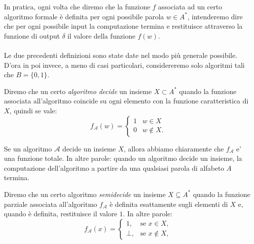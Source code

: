 In pratica, ogni volta che diremo che la funzione $f$ associata ad un certo algoritmo formale è definita per ogni possibile parola $w \in A^*$, intenderemo dire che per ogni possibile input la computazione termina e restituisce attraverso la funzione di output $\delta$ il valore della funzione $f(w)$.
\\ \\
Le due precedenti definizioni sono state date nel modo più generale possibile.
D'ora in poi invece,
a meno di casi particolari,
considereremo solo algoritmi tali che $B=\{ 0,1\}$.

\begin{defi}
Diremo che un certo \textit{algoritmo decide} un insieme 
$X \subset A^*$
 quando la funzione associata all'algoritmo coincide su ogni elemento con la funzione caratteristica di 
 $X$,
quindi se vale:
\[
f_\mathcal{A}(w) = 
\begin{cases} 1 & w \in X \\ 0 & w \notin X. \end{cases}
\]
\end{defi}

\begin{rema}
Se un algoritmo $\mathcal A$
decide un insieme $X$,
allora abbiamo chiaramente che $f_{\mathcal A}$ 
e' una funzione totale.
In altre parole:
quando un algoritmo decide un insieme,
la computazione dell'algoritmo a partire da una qualsiasi parola di alfabeto 
$A$
termina.
\end{rema}

\begin{defi}
Diremo che un certo algoritmo  \textit{semidecide} un insieme
$X \subseteq A^*$ quando la funzione parziale associata all'algoritmo
$f_{\mathcal A}$ è definita esattamente sugli elementi di $X$ e, quando è
definita, restituisce il valore $1$. In altre parole:
\[
f_{\mathcal A}(x)=
\begin{cases}
1, & \text{se } x\in X,\\
\bot, & \text{se } x\notin X,
\end{cases}
\]
\end{defi}

